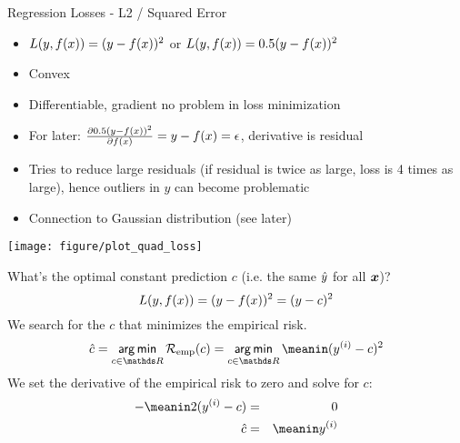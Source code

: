 \documentclass[11pt,compress,t,notes=noshow, xcolor=table]{beamer}
\newenvironment{knitrout}{}{} %
\begin{document}
\begin{vbframe}{Regression Losses - L2 / Squared Error}
\begin{itemize}
\item $L(y, f(x)) = (y-f(x))^2$ or $L(y, f(x)) = 0.5 (y-f(x))^2$
\item Convex
\item Differentiable, gradient no problem in loss minimization
\item For later: $\frac{\partial{0.5 (y-f(x))^2}}{\partial f(x)} = y - f(x) = \epsilon$, derivative is residual
\item Tries to reduce large residuals (if residual is twice as large, loss is 4 times as large), hence
  outliers in $y$ can become problematic
\item Connection to Gaussian distribution (see later)
\end{itemize}

\begin{knitrout}\scriptsize
{}\color{fgcolor}

{\centering \texttt{[image: figure/plot\_quad\_loss]} 
}



\end{knitrout}
\framebreak


What's the optimal constant prediction $c$ (i.e. the same $\hat{y}$ for all $\bm{x}$)?
$$L(y, f(x)) = (y-f(x))^2 = (y - c)^2$$
We search for the $c$ that minimizes the empirical risk.
$$  \hat{c} = \argmin_{c \in \R}\riske(c)  =  \argmin_{c \in \R} \meanin  (\yi-c)^2 $$
We set the derivative of the empirical risk to zero and solve for $c$:
\begin{eqnarray*}
 -\meanin 2(\yi - c) &=& 0 \cr
\hat{c} &=& \meanin \yi
\end{eqnarray*}

%
%
\end{vbframe}
\end{document}
